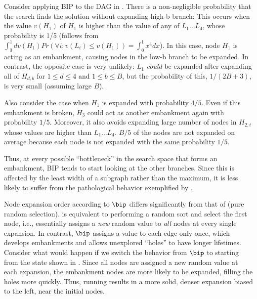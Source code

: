 Consider applying BIP to the DAG in .
There is a non-negligible probability that the search finds the solution without expanding high-b branch:
This occurs when the value $v(H_1)$ of $H_1$ is higher than the value of any of $L_1\ldots L_4$,
whose probability is 1/5
 (follows from $\int_0^1 dv(H_1) Pr(\forall i; v(L_i)\leq v(H_1)) = \int_0^1 x^4dx$). 
In this case, node $H_1$ is acting as an embankment, causing nodes in the  low-b branch to be expanded.
In contrast, the opposite case is very unlikely:
$L_1$ \emph{could} be expanded after expanding all of $H_{d,b}$ for $1\leq d\leq 4$ and $1\leq b \leq B$,
 but the probability of this,  $1/(2B+3)$,  is very small (assuming large $B$).

Also consider the case when $H_1$ is expanded with probability $4/5$.
Even if this embankment is broken, $H_3$ could act as another embankment again with probability $1/5$.
Moreover, it also avoids expanding large number of nodes in $H_{2,i}$ whose values are higher than $L_1\ldots L_4$.
$B/5$ of the nodes are not expanded on average because each node is not expanded with the same probability $1/5$.

Thus, at every possible ``bottleneck'' in the search space that forms an embankment, BIP tends to start looking at the other branches.
Since this is affected by the least width of a subgraph rather than the maximum,
it is less likely to suffer from the pathological behavior exemplified by .


Node expansion order according to $\bip$ differs  significantly from that of \ro (pure random selection).
% 
\ro is equivalent to performing a random sort and select the first node, i.e., \ro essentially assigns a \emph{new} random value to \emph{all} nodes at every single expansion.
In contrast, $\bip$ assigns a value to each edge only once, which develops embankments and allows unexplored ``holes'' to have longer lifetimes.
% 
% 
Consider what would happen if we switch the behavior from $\bip$ to \ro starting from the state shown in . Since all nodes are assigned a new random value at each expansion, the embankment nodes are more likely to be expanded, filling the holes more quickly. Thus, running \ro results in a more solid, denser expansion biased to the left, near the initial nodes.





